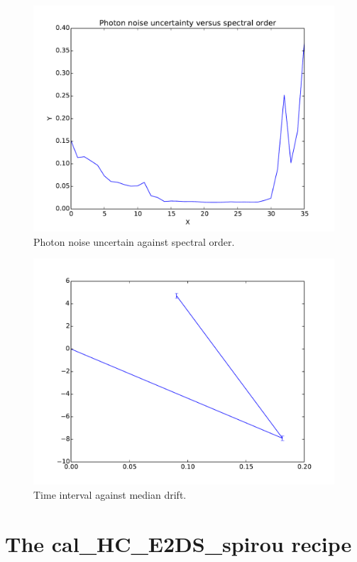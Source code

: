 \begin{figure}
\begin{center}
\includegraphics[width=.8\textwidth]{figures/cal_DRIFT_RAW_spirou_2}
\caption{Photon noise uncertain against spectral order. \label{figure:cal_DRIFT_RAW_spirou_2}}
\end{center}
\end{figure}

\begin{figure}
\begin{center}
\includegraphics[width=.8\textwidth]{figures/cal_DRIFT_RAW_spirou_3}
\caption{Time interval against median drift. \label{figure:cal_DRIFT_RAW_spirou_3}}
\end{center}
\end{figure}



\clearpage
\newpage
\section{The cal\_HC\_E2DS\_spirou recipe}
\label{section:cal_HC_E2DS}

